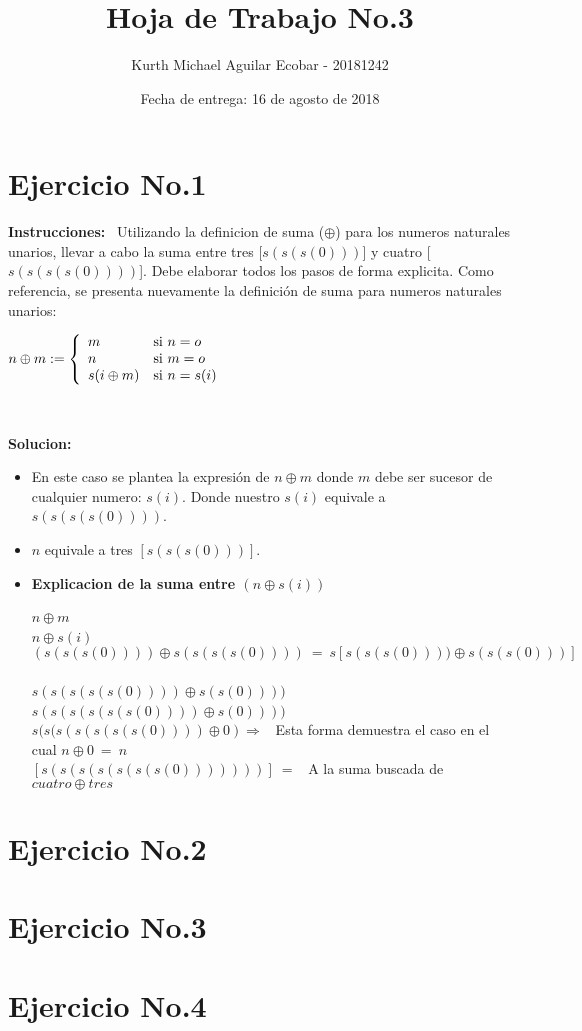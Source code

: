 \documentclass[10pt,a4paper]{article}
\begin{document}
\title{Hoja de Trabajo No.3}
\author{Kurth Michael Aguilar Ecobar - 20181242}
\date{ Fecha de entrega: 16 de agosto de 2018 }
\maketitle


\section*{Ejercicio No.1}

\begin{flushleft}
\textbf{Instrucciones:} \ Utilizando la definicion de suma ($\oplus$) para los numeros naturales unarios, llevar
a cabo la suma entre tres [$s(s(s(0)))$] y cuatro [$s(s(s(s(0))))$]. Debe elaborar todos
los pasos de forma explicita. Como referencia, se presenta nuevamente la definici\'on de
suma para numeros naturales unarios:
\end{flushleft}

\begin{center}
$ n\oplus m := \left\{ 
\begin{array}{l l}
 m & \mbox{si } n=o \\ 
 n & \mbox{si } m=o \\ 
 s(i\oplus m) & \mbox{si } n=s(i) \\ 
 \end{array}
 \right.$
\end{center}

\
\\\begin{large}
\textbf{Solucion:}
\end{large}
\begin{itemize}
\item En este caso se plantea la expresión de $ n\oplus m $ donde $ m $ debe ser sucesor de cualquier numero: $ s(i) $. Donde nuestro $ s(i) $ equivale a   \ $ s(s(s(s(0))))  $. 
\item $n$ equivale a tres $ \left[ s(s(s(0))) \right]  $. 
\item \textbf{Explicacion de la suma entre $ (n\oplus s(i)) $}
\begin{center}
$ n\oplus m $
\
\\$n\oplus s(i)$
\
\\$( s(s(s(0)))) \oplus s(s(s(s(0)))) \ = \ s[ s(s(s(0)))) \oplus s(s(s(0)))]$
\
\\$ s(s(s(s(s(0)))) \oplus s(s(0))))$
\
\\$ s(s(s(s(s(s(0)))) \oplus s(0))))$
\
\\$ s(s(s(s(s(s(s(0)))) \oplus 0) \Rightarrow $ \ Esta forma demuestra el caso en el cual $ n\oplus 0 \ = \ n$
\
\\ $[s(s(s(s(s(s(s(0)))))))] \ =  $ \ A la suma buscada de  $ cuatro\oplus tres$ 
\end{center}
\end{itemize}

\section*{Ejercicio No.2}
\section*{Ejercicio No.3}
\section*{Ejercicio No.4}
\end{document}
